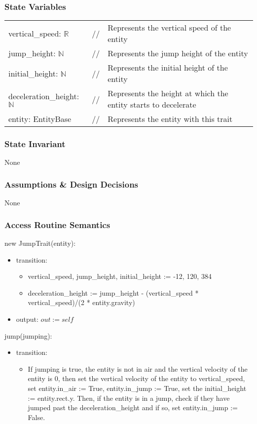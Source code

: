 \documentclass[12pt]{article}
\begin{document}
\subsubsection* {State Variables}
\begin{tabular}{lll}
    vertical\_speed: $\mathbb{R}$ & // & Represents the vertical speed of the entity\\
    jump\_height: $\mathbb{N}$ & // & Represents the jump height of the entity\\
    initial\_height: $\mathbb{N}$ & // & Represents the initial height of the entity\\
    deceleration\_height: $\mathbb{N}$ & // & Represents the height at which the entity starts to decelerate\\
    entity: EntityBase & // & Represents the entity with this trait\\
\end{tabular}

\subsubsection* {State Invariant}

None

\subsubsection* {Assumptions \& Design Decisions}

None

\subsubsection* {Access Routine Semantics}

new JumpTrait(entity):
\begin{itemize}
    \item transition: 
    \begin{itemize}[]
        \item vertical\_speed, jump\_height, initial\_height := -12, 120, 384
        \item deceleration\_height := jump\_height - (vertical\_speed * vertical\_speed)/(2 * entity.gravity)
    \end{itemize}
    \item output: $out := self$
\end{itemize}

jump(jumping):
\begin{itemize}
    \item transition: 
    \begin{itemize}[]
        \item If jumping is true, the entity is not in air and the vertical velocity of the entity is 0, then set the vertical velocity of the entity to vertical\_speed, set entity.in\_air := True, entity.in\_jump := True, set the initial\_height := entity.rect.y. Then, if the entity is in a jump, check if they have jumped past the deceleration\_height and if so, set entity.in\_jump := False.
    \end{itemize}
\end{itemize}
\end{document}
